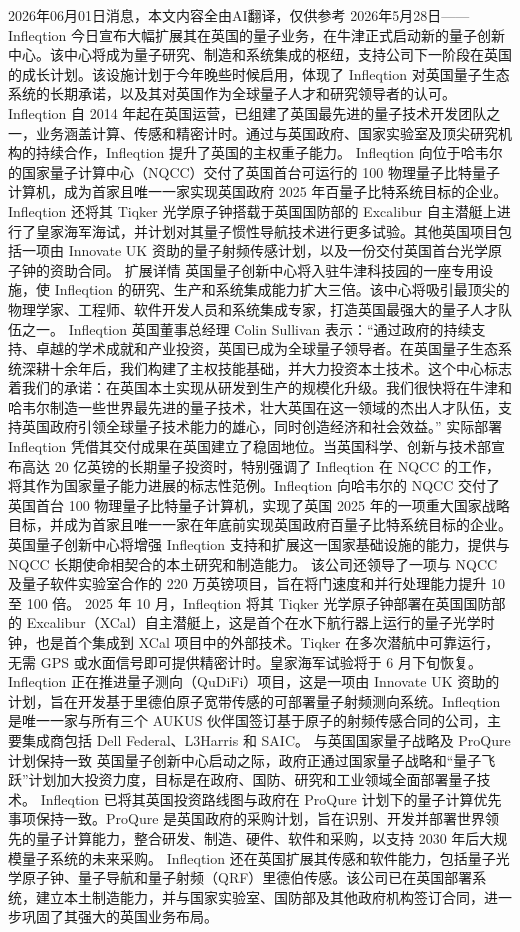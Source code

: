 \documentclass[12pt,a4paper]{ctexart}
\begin{document}
2026年06月01日消息，本文内容全由AI翻译，仅供参考
2026年5月28日——Infleqtion 今日宣布大幅扩展其在英国的量子业务，在牛津正式启动新的量子创新中心。该中心将成为量子研究、制造和系统集成的枢纽，支持公司下一阶段在英国的成长计划。该设施计划于今年晚些时候启用，体现了 Infleqtion 对英国量子生态系统的长期承诺，以及其对英国作为全球量子人才和研究领导者的认可。
Infleqtion 自 2014 年起在英国运营，已组建了英国最先进的量子技术开发团队之一，业务涵盖计算、传感和精密计时。通过与英国政府、国家实验室及顶尖研究机构的持续合作，Infleqtion 提升了英国的主权重子能力。
Infleqtion 向位于哈韦尔的国家量子计算中心（NQCC）交付了英国首台可运行的 100 物理量子比特量子计算机，成为首家且唯一一家实现英国政府 2025 年百量子比特系统目标的企业。Infleqtion 还将其 Tiqker 光学原子钟搭载于英国国防部的 Excalibur 自主潜艇上进行了皇家海军海试，并计划对其量子惯性导航技术进行更多试验。其他英国项目包括一项由 Innovate UK 资助的量子射频传感计划，以及一份交付英国首台光学原子钟的资助合同。
扩展详情
英国量子创新中心将入驻牛津科技园的一座专用设施，使 Infleqtion 的研究、生产和系统集成能力扩大三倍。该中心将吸引最顶尖的物理学家、工程师、软件开发人员和系统集成专家，打造英国最强大的量子人才队伍之一。
Infleqtion 英国董事总经理 Colin Sullivan 表示：“通过政府的持续支持、卓越的学术成就和产业投资，英国已成为全球量子领导者。在英国量子生态系统深耕十余年后，我们构建了主权技能基础，并大力投资本土技术。这个中心标志着我们的承诺：在英国本土实现从研发到生产的规模化升级。我们很快将在牛津和哈韦尔制造一些世界最先进的量子技术，壮大英国在这一领域的杰出人才队伍，支持英国政府引领全球量子技术能力的雄心，同时创造经济和社会效益。”
实际部署
Infleqtion 凭借其交付成果在英国建立了稳固地位。当英国科学、创新与技术部宣布高达 20 亿英镑的长期量子投资时，特别强调了 Infleqtion 在 NQCC 的工作，将其作为国家量子能力进展的标志性范例。Infleqtion 向哈韦尔的 NQCC 交付了英国首台 100 物理量子比特量子计算机，实现了英国 2025 年的一项重大国家战略目标，并成为首家且唯一一家在年底前实现英国政府百量子比特系统目标的企业。英国量子创新中心将增强 Infleqtion 支持和扩展这一国家基础设施的能力，提供与 NQCC 长期使命相契合的本土研究和制造能力。
该公司还领导了一项与 NQCC 及量子软件实验室合作的 220 万英镑项目，旨在将门速度和并行处理能力提升 10 至 100 倍。
2025 年 10 月，Infleqtion 将其 Tiqker 光学原子钟部署在英国国防部的 Excalibur（XCal）自主潜艇上，这是首个在水下航行器上运行的量子光学时钟，也是首个集成到 XCal 项目中的外部技术。Tiqker 在多次潜航中可靠运行，无需 GPS 或水面信号即可提供精密计时。皇家海军试验将于 6 月下旬恢复。
Infleqtion 正在推进量子测向（QuDiFi）项目，这是一项由 Innovate UK 资助的计划，旨在开发基于里德伯原子宽带传感的可部署量子射频测向系统。Infleqtion 是唯一一家与所有三个 AUKUS 伙伴国签订基于原子的射频传感合同的公司，主要集成商包括 Dell Federal、L3Harris 和 SAIC。
与英国国家量子战略及 ProQure 计划保持一致
英国量子创新中心启动之际，政府正通过国家量子战略和“量子飞跃”计划加大投资力度，目标是在政府、国防、研究和工业领域全面部署量子技术。
Infleqtion 已将其英国投资路线图与政府在 ProQure 计划下的量子计算优先事项保持一致。ProQure 是英国政府的采购计划，旨在识别、开发并部署世界领先的量子计算能力，整合研发、制造、硬件、软件和采购，以支持 2030 年后大规模量子系统的未来采购。
Infleqtion 还在英国扩展其传感和软件能力，包括量子光学原子钟、量子导航和量子射频（QRF）里德伯传感。该公司已在英国部署系统，建立本土制造能力，并与国家实验室、国防部及其他政府机构签订合同，进一步巩固了其强大的英国业务布局。
\end{document}
